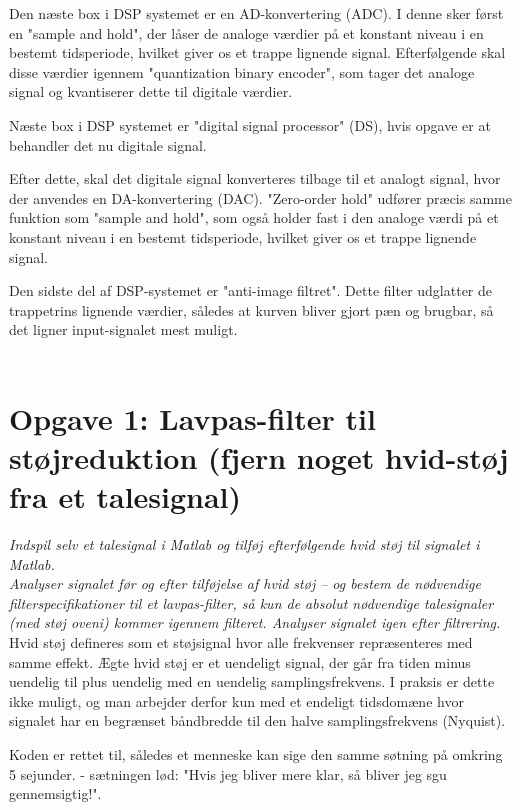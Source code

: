 \documentclass[a4paper]{report}
\begin{document}
Den næste box i DSP systemet er en AD-konvertering (ADC). I denne sker først en "sample and hold", der låser de analoge værdier på et konstant niveau i en bestemt tidsperiode, hvilket giver os et trappe lignende signal. Efterfølgende skal disse værdier igennem  "quantization binary encoder", som tager det analoge signal og kvantiserer dette til digitale værdier.

Næste box i DSP systemet er "digital signal processor" (DS), hvis opgave er at behandler det nu digitale signal.

Efter dette, skal det digitale signal konverteres tilbage til et analogt signal, hvor der anvendes en DA-konvertering (DAC). 
"Zero-order hold" udfører præcis samme funktion som "sample and hold", som også holder fast i den analoge værdi på et konstant niveau i en bestemt tidsperiode, hvilket giver os et trappe lignende signal.  

Den sidste del af DSP-systemet er "anti-image filtret". Dette filter udglatter de trappetrins lignende værdier, således at kurven bliver gjort pæn og brugbar, så det ligner input-signalet mest muligt.\\
\\

\section*{Opgave 1: Lavpas-filter til støjreduktion (fjern noget hvid-støj fra et talesignal)}
\textit{Indspil selv et talesignal i Matlab og tilføj efterfølgende hvid støj til signalet i Matlab.\\ 
Analyser signalet før og efter tilføjelse af hvid støj – og bestem de nødvendige filterspecifikationer til et lavpas-filter, så kun de absolut nødvendige talesignaler (med støj oveni) kommer igennem filteret.
Analyser signalet igen efter filtrering.}\\

Hvid støj defineres som et støjsignal hvor alle frekvenser repræsenteres med samme effekt. Ægte hvid støj er et uendeligt signal, der går fra tiden minus uendelig til plus uendelig med en uendelig samplingsfrekvens. I praksis er dette ikke muligt, og man arbejder derfor kun med et endeligt tidsdomæne hvor signalet har en begrænset båndbredde til den halve samplingsfrekvens (Nyquist). 

Koden er rettet til, således et menneske kan sige den samme søtning på omkring 5 sejunder. - sætningen lød: "Hvis jeg bliver mere klar, så bliver jeg sgu gennemsigtig!". 
\end{document}
